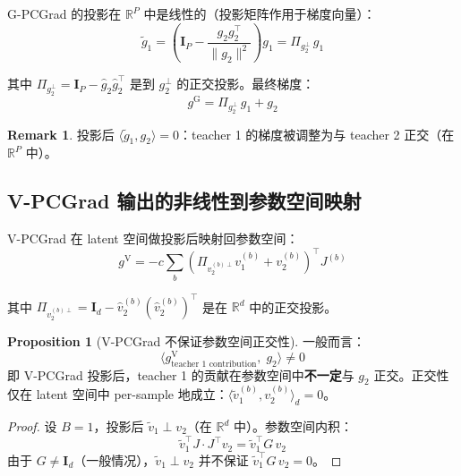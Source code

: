\documentclass[11pt,a4paper]{article}
\newcommand{\R}{\mathbb{R}}
\theoremstyle{definition}
\newtheorem{remark}{Remark}
\newtheorem{proposition}{Proposition}
\begin{document}
G-PCGrad 的投影在 $\R^P$ 中是线性的（投影矩阵作用于梯度向量）：
\begin{equation}
\tilde{g}_1 = \left(\bm{I}_P - \frac{g_2 g_2^\top}{\|g_2\|^2}\right) g_1
= \Pi_{g_2^\perp}\, g_1
\end{equation}

其中 $\Pi_{g_2^\perp} = \bm{I}_P - \hat{g}_2\hat{g}_2^\top$ 是到 $g_2^\perp$ 的正交投影。最终梯度：
\begin{equation}
g^{\mathrm{G}} = \Pi_{g_2^\perp}\, g_1 + g_2
\end{equation}

\begin{remark}
投影后 $\langle \tilde{g}_1, g_2\rangle = 0$：teacher 1 的梯度被调整为与 teacher 2 正交（在 $\R^P$ 中）。
\end{remark}

\subsection{V-PCGrad 输出的非线性到参数空间映射}

V-PCGrad 在 latent 空间做投影后映射回参数空间：
\begin{equation}
g^{\mathrm{V}} = -c\sum_b \left(\Pi_{v_2^{(b)\perp}} v_1^{(b)} + v_2^{(b)}\right)^\top J^{(b)}
\end{equation}

其中 $\Pi_{v_2^{(b)\perp}} = \bm{I}_d - \hat{v}_2^{(b)}(\hat{v}_2^{(b)})^\top$ 是在 $\R^d$ 中的正交投影。

\begin{proposition}[V-PCGrad 不保证参数空间正交性]
一般而言：
\begin{equation}
\langle g^{\mathrm{V}}_{\text{teacher 1 contribution}},\; g_2 \rangle \neq 0
\end{equation}
即 V-PCGrad 投影后，teacher 1 的贡献在参数空间中\textbf{不一定}与 $g_2$ 正交。正交性仅在 latent 空间中 per-sample 地成立：$\langle \tilde{v}_1^{(b)}, v_2^{(b)}\rangle_d = 0$。
\end{proposition}

\begin{proof}
设 $B=1$，投影后 $\tilde{v}_1 \perp v_2$（在 $\R^d$ 中）。参数空间内积：
\begin{equation}
\tilde{v}_1^\top J \cdot J^\top v_2 = \tilde{v}_1^\top G\, v_2
\end{equation}
由于 $G \neq \bm{I}_d$（一般情况），$\tilde{v}_1 \perp v_2$ 并不保证 $\tilde{v}_1^\top G\, v_2 = 0$。
\end{proof}
\end{document}
